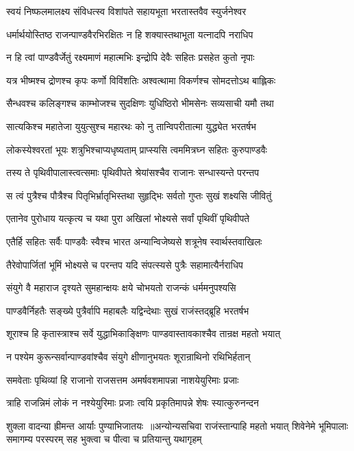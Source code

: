 \twolineshloka
{स्वयं निष्फलमालक्ष्य संविधत्स्व विशांपते}
{सहायभूता भरतास्तवैव स्युर्जनेश्वर}


\twolineshloka
{धर्मार्थयोस्तिष्ठ राजन्पाण्डवैरभिरक्षितः}
{न हि शक्यास्तथाभूता यत्नादपि नराधिप}


\twolineshloka
{न हि त्वां पाण्डवैर्जेतुं रक्ष्यमाणं महात्मभिः}
{इन्द्रोपि देवैः सहितः प्रसहेत कुतो नृपाः}


\twolineshloka
{यत्र भीष्मश्च द्रोणश्च कृपः कर्णो विविंशतिः}
{अश्वत्थामा विकर्णश्च सोमदत्तोऽथ बाह्लिकः}


\twolineshloka
{सैन्धवश्च कलिङ्गश्च काम्भोजश्च सुदक्षिणः}
{युधिष्ठिरो भीमसेनः सव्यसाची यमौ तथा}


\twolineshloka
{सात्यकिश्च महातेजा युयुत्सुश्च महारथः}
{को नु तान्विपरीतात्मा युद्ध्येत भरतर्षभ}


\twolineshloka
{लोकस्येश्वरतां भूयः शत्रुभिश्चाप्यधृष्यताम्}
{प्राप्स्यसि त्वममित्रघ्न सहितः कुरुपाण्डवैः}


\twolineshloka
{तस्य ते पृथिवीपालास्त्वत्समाः पृथिवीपते}
{श्रेयांसश्चैव राजानः सन्धास्यन्ते परन्तप}


\twolineshloka
{स त्वं पुत्रैश्च पौत्रैश्च पितृभिर्भ्रातृभिस्तथा}
{सुहृद्भिः सर्वतो गुप्तः सुखं शक्ष्यसि जीवितुं}


\twolineshloka
{एतानेव पुरोधाय यत्कृत्य च यथा पुरा}
{अखिलां भोक्ष्यसे सर्वां पृथिवीं पृथिवीपते}


\twolineshloka
{एतैर्हि सहितः सर्वैः पाण्डवैः स्वैश्च भारत}
{अन्यान्विजेष्यसे शत्रूनेष स्वार्थस्तवाखिलः}


\twolineshloka
{तैरेवोपार्जितां भूमिं भोक्ष्यसे च परन्तप}
{यदि संपत्स्यसे पुत्रैः सहामात्यैर्नराधिप}


\twolineshloka
{संयुगे वै महाराज दृश्यते सुमहान्क्षयः}
{क्षये चोभयतो राजन्कं धर्ममनुपश्यसि}


\twolineshloka
{पाण्डवैर्निहतैः सङ्ख्ये पुत्रैर्वापि महाबलैः}
{यद्विन्देथाः सुखं राजंस्तद्ब्रूहि भरतर्षभ}


\twolineshloka
{शूराश्च हि कृतास्त्राश्च सर्वे युद्धाभिकाङ्क्षिणः}
{पाण्डवास्तावकाश्चैव तान्रक्ष महतो भयात्}


\twolineshloka
{न पश्येम कुरून्सर्वान्पाण्डवांश्चैव संयुगे}
{क्षीणानुभयतः शूरान्राथिनो रथिभिर्हतान्}


\twolineshloka
{समवेताः पृथिव्यां हि राजानो राजसत्तम}
{अमर्षवशमापन्ना नाशयेयुरिमाः प्रजाः}


\twolineshloka
{त्राहि राजन्निमं लोकं न नश्येयुरिमाः प्रजाः}
{त्वयि प्रकृतिमापन्ने शेषः स्यात्कुरुनन्दन}


शुक्ला वादन्या ह्रीमन्त आर्याः पुण्याभिजातयः ॥अन्योन्यसचिवा राजंस्तान्पाहि महतो भयात्
\twolineshloka
{शिवेनेमे भूमिपालाः समागम्य परस्परम्}
{सह भुक्त्वा च पीत्वा च प्रतियान्तु यथागृहम्}



